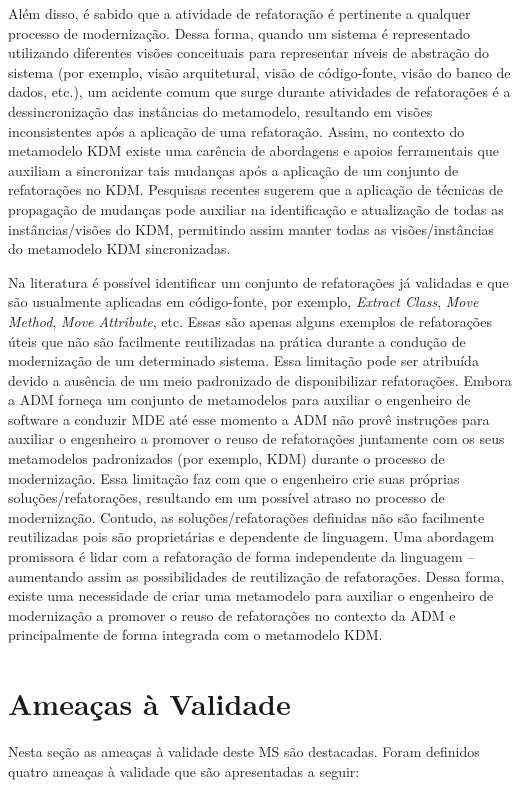 Além disso, é sabido que a atividade de refatoração é pertinente a qualquer processo de modernização. Dessa forma, quando um sistema é representado utilizando diferentes visões conceituais para representar níveis de abstração do sistema (por exemplo, visão arquitetural, visão de código-fonte, visão do banco de dados, etc.), um acidente comum que surge durante atividades de refatorações é a dessincronização das instâncias do metamodelo, resultando em visões inconsistentes após a aplicação de uma refatoração. Assim, no contexto do metamodelo KDM existe uma carência de abordagens e apoios ferramentais que auxiliam a sincronizar tais mudanças após a aplicação de um conjunto de refatorações no KDM. Pesquisas recentes sugerem que a aplicação de técnicas de propagação de mudanças pode auxiliar na identificação e atualização de todas as instâncias/visões do KDM, permitindo assim manter todas as visões/instâncias do metamodelo KDM sincronizadas. 

Na literatura é possível identificar um conjunto de refatorações já validadas e que são usualmente aplicadas em código-fonte, por exemplo, \textit{Extract Class}, \textit{Move Method}, \textit{Move Attribute}, etc. Essas são apenas alguns exemplos de refatorações úteis que não são facilmente reutilizadas na prática durante a condução de modernização de um determinado sistema. Essa limitação pode ser atribuída devido a ausência de um meio padronizado de disponibilizar refatorações. Embora a ADM forneça um conjunto de metamodelos para auxiliar o engenheiro de software a conduzir MDE até esse momento a ADM não provê instruções para auxiliar o engenheiro a promover o reuso de refatorações juntamente com os seus metamodelos padronizados (por exemplo, KDM) durante o processo de modernização. Essa limitação faz com que o engenheiro crie suas próprias soluções/refatorações, resultando em um possível atraso no processo de modernização. Contudo, as soluções/refatorações definidas não são facilmente reutilizadas pois são proprietárias e dependente de linguagem. Uma abordagem promissora é lidar com a refatoração de forma independente da linguagem – aumentando assim as possibilidades de reutilização de refatorações. Dessa forma, existe uma necessidade de criar uma metamodelo para auxiliar o engenheiro de modernização a promover o reuso de refatorações no contexto da ADM e principalmente de forma integrada com o metamodelo KDM. 

\section{Ameaças à Validade}\label{subsec:ameaças_a_validade}
Nesta seção as ameaças à validade deste MS são destacadas. Foram definidos quatro ameaças à validade que são apresentadas a seguir:


